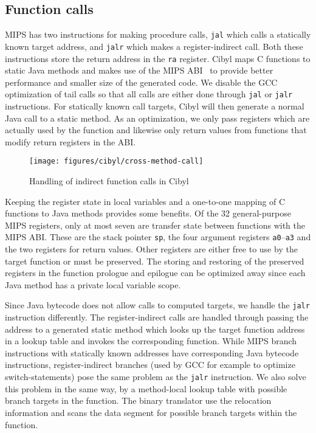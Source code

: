 \subsection{Function calls}
\label{sec:cibyl:function_calls}
MIPS has two instructions for making procedure calls, \texttt{jal} which calls
a statically known target address, and \texttt{jalr} which makes a
register-indirect call. Both these instructions store the return address in
the \texttt{ra} register. Cibyl maps C functions to static Java methods and
makes use of the MIPS ABI~\cite{sco96mipsabi} to provide better performance
and smaller size of the generated code. We disable the GCC optimization of
tail calls so that all calls are either done through \texttt{jal} or
\texttt{jalr} instructions. For statically known call targets, Cibyl will then
generate a normal Java call to a static method.  As an optimization, we only
pass registers which are actually used by the function and likewise only
return values from functions that modify return registers in the ABI.

\begin{figure*}[htb]
  \begin{center}
    \texttt{[image: figures/cibyl/cross-method-call]}
    \caption{Handling of indirect function calls in Cibyl}
    \label{fig:cibyl:function_calls}
  \end{center}
\end{figure*}

Keeping the register state in local variables and a one-to-one mapping of C
functions to Java methods provides some benefits. Of the 32 general-purpose
MIPS registers, only at most seven are transfer state between functions with
the MIPS ABI. These are the stack pointer \texttt{sp}, the four argument
registers \texttt{a0}--\texttt{a3} and the two registers for return values.
Other registers are either free to use by the target function or must be
preserved. The storing and restoring of the preserved registers in the
function prologue and epilogue can be optimized away since each Java method
has a private local variable scope.

Since Java bytecode does not allow calls to computed targets, we handle the
\texttt{jalr} instruction differently. The register-indirect calls are handled
through passing the address to a generated static method which looks up the
target function address in a lookup table and invokes the corresponding
function. While MIPS branch instructions with statically known addresses have
corresponding Java bytecode instructions, register-indirect branches (used by
GCC for example to optimize switch-statements) pose the same problem as the
\texttt{jalr} instruction. We also solve this problem in the same way, by a
method-local lookup table with possible branch targets in the function. The
binary translator use the relocation information and scans the data segment
for possible branch targets within the function.

